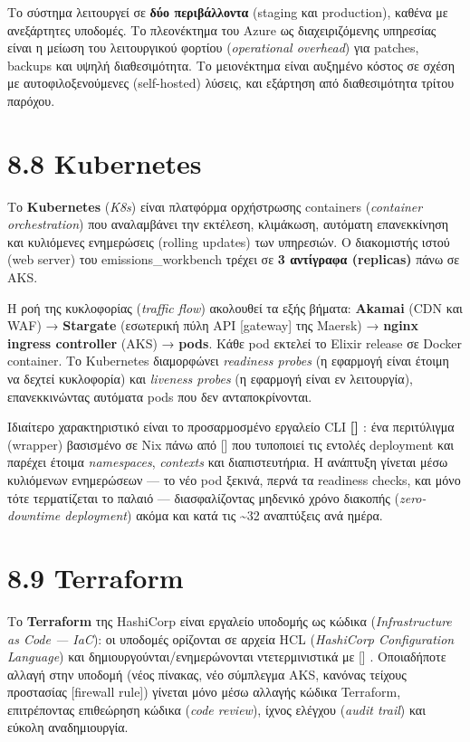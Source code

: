\documentclass[11pt,a4paper,greek,twoside]{template-xe}
\let\origtexttt\texttt
\renewcommand{\texttt}[1]{%
  \begingroup
  \StrSubstitute{#1}{.}{.\allowbreak}[\tttmp]%
  \origtexttt{\tttmp}%
  \endgroup
}
\begin{document}
Το σύστημα λειτουργεί σε \textbf{δύο περιβάλλοντα} (staging και
production), καθένα με ανεξάρτητες υποδομές. Το πλεονέκτημα του Azure ως
διαχειριζόμενης υπηρεσίας είναι η μείωση του λειτουργικού φορτίου
(\emph{operational overhead}) για patches, backups και υψηλή
διαθεσιμότητα. Το μειονέκτημα είναι αυξημένο κόστος σε σχέση με
αυτοφιλοξενούμενες (self-hosted) λύσεις, και εξάρτηση από διαθεσιμότητα
τρίτου παρόχου.

\section{8.8 Kubernetes}\label{kubernetes}

Το \textbf{Kubernetes} (\emph{K8s}) είναι πλατφόρμα ορχήστρωσης
containers (\emph{container orchestration}) που αναλαμβάνει την
εκτέλεση, κλιμάκωση, αυτόματη επανεκκίνηση και κυλιόμενες ενημερώσεις
(rolling updates) των υπηρεσιών. Ο διακομιστής ιστού (web server) του
emissions\_workbench τρέχει σε \textbf{3 αντίγραφα (replicas)} πάνω σε
AKS.

Η ροή της κυκλοφορίας (\emph{traffic flow}) ακολουθεί τα εξής βήματα:
\textbf{Akamai} (CDN και WAF) → \textbf{Stargate} (εσωτερική πύλη API
{[}gateway{]} της Maersk) → \textbf{nginx ingress controller} (AKS) →
\textbf{pods}. Κάθε pod εκτελεί το Elixir release σε Docker container.
Το Kubernetes διαμορφώνει \emph{readiness probes} (η εφαρμογή είναι
έτοιμη να δεχτεί κυκλοφορία) και \emph{liveness probes} (η εφαρμογή
είναι εν λειτουργία), επανεκκινώντας αυτόματα pods που δεν
ανταποκρίνονται.

Ιδιαίτερο χαρακτηριστικό είναι το προσαρμοσμένο εργαλείο CLI
\textbf{\texttt{k8s}}: ένα περιτύλιγμα (wrapper) βασισμένο σε Nix πάνω
από \texttt{kubectl} που τυποποιεί τις εντολές deployment και παρέχει
έτοιμα \emph{namespaces}, \emph{contexts} και διαπιστευτήρια. Η ανάπτυξη
γίνεται μέσω κυλιόμενων ενημερώσεων --- το νέο pod ξεκινά, περνά τα
readiness checks, και μόνο τότε τερματίζεται το παλαιό ---
διασφαλίζοντας μηδενικό χρόνο διακοπής (\emph{zero-downtime deployment})
ακόμα και κατά τις \textasciitilde32 αναπτύξεις ανά ημέρα.

\section{8.9 Terraform}\label{terraform}

Το \textbf{Terraform} της HashiCorp είναι εργαλείο υποδομής ως κώδικα
(\emph{Infrastructure as Code --- IaC}): οι υποδομές ορίζονται σε αρχεία
HCL (\emph{HashiCorp Configuration Language}) και
δημιουργούνται/ενημερώνονται ντετερμινιστικά με
\texttt{terraform\ apply}. Οποιαδήποτε αλλαγή στην υποδομή (νέος
πίνακας, νέο σύμπλεγμα AKS, κανόνας τείχους προστασίας {[}firewall
rule{]}) γίνεται μόνο μέσω αλλαγής κώδικα Terraform, επιτρέποντας
επιθεώρηση κώδικα (\emph{code review}), ίχνος ελέγχου (\emph{audit
trail}) και εύκολη αναδημιουργία.
\end{document}

